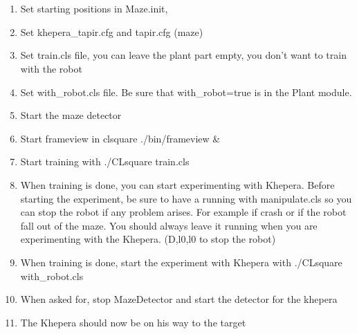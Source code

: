 \section{\clsquare}
\label{sec:howto:clsquare}

    \begin{enumerate}
        \item Set starting positions in Maze.init, 
        \item Set khepera\_tapir.cfg and tapir.cfg (maze)
        \item Set train.cls file, you can leave the plant part empty, 
            you don’t want to train with the robot
        \item Set with\_robot.cls file. Be sure that with\_robot=true is in 
            the Plant module.
        \item Start the maze detector 
        \item Start frameview in clsquare ./bin/frameview \&
        \item Start training with ./CLsquare train.cls
        \item When training is done, you can start experimenting with 
            Khepera. Before starting the experiment, be sure to have a 
            \clsquare running with manipulate.cls so you can stop the 
            robot if any problem arises. For example if \clsquare crash 
            or if the robot fall out of the maze. You should always 
            leave it running when you are experimenting with the 
            Khepera. (D,l0,l0 to stop the robot)
        \item When training is done, start the experiment with Khepera 
            with ./CLsquare with\_robot.cls
        \item When asked for, stop MazeDetector and start the detector 
            for the khepera
        \item The Khepera should now be on his way to the target
    \end{enumerate}

